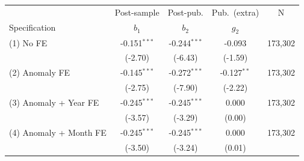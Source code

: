 \begin{tabular}{lcccc}
\toprule
 & Post-sample & Post-pub. & Pub.\ (extra) & N \\
Specification & $b_1$ & $b_2$ & $g_2$ & \\
\midrule
(1) No FE & -0.151$^{***}$ & -0.244$^{***}$ & -0.093 & 173,302 \\
 & (-2.70) & (-6.43) & (-1.59) & \\
(2) Anomaly FE & -0.145$^{***}$ & -0.272$^{***}$ & -0.127$^{**}$ & 173,302 \\
 & (-2.75) & (-7.90) & (-2.22) & \\
(3) Anomaly + Year FE & -0.245$^{***}$ & -0.245$^{***}$ & 0.000 & 173,302 \\
 & (-3.57) & (-3.29) & (0.00) & \\
(4) Anomaly + Month FE & -0.245$^{***}$ & -0.245$^{***}$ & 0.000 & 173,302 \\
 & (-3.50) & (-3.24) & (0.01) & \\
\bottomrule
\end{tabular}